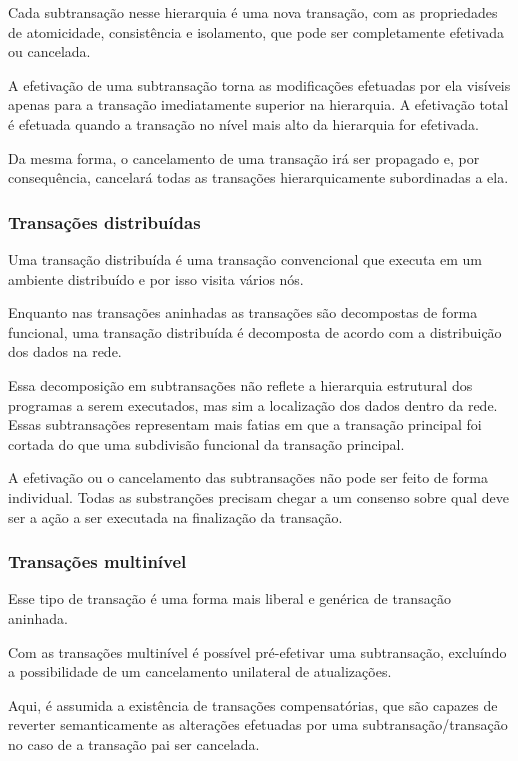 \documentclass[11pt,twoside,a4paper]{book}
\begin{document}
Cada subtransação nesse hierarquia é uma nova transação, com as propriedades de atomicidade, consistência e isolamento, que pode ser completamente efetivada ou cancelada. 

A efetivação de uma subtransação torna as modificações efetuadas por ela visíveis apenas para a transação imediatamente superior na hierarquia. A efetivação total é efetuada quando a transação no nível mais alto da hierarquia for efetivada.

Da mesma forma, o cancelamento de uma transação irá ser propagado e, por consequência, cancelará todas as transações hierarquicamente subordinadas a ela.

\subsubsection*{Transações distribuídas}
Uma transação distribuída é uma transação convencional que executa em um ambiente distribuído e por isso visita vários nós.

Enquanto nas transações aninhadas as transações são decompostas de forma funcional, uma transação distribuída é decomposta de acordo com a distribuição dos dados na rede.

Essa decomposição em subtransações não reflete a hierarquia estrutural dos programas a serem executados, mas sim a localização dos dados dentro da rede. Essas subtransações representam mais fatias em que a transação principal foi cortada do que uma subdivisão funcional da transação principal.

A efetivação ou o cancelamento das subtransações não pode ser feito de forma individual. Todas as substranções precisam chegar a um consenso sobre qual deve ser a ação a ser executada na finalização da transação.

\subsubsection*{Transações multinível}
Esse tipo de transação é uma forma mais liberal e genérica de transação aninhada.

Com as transações multinível é possível pré-efetivar uma subtransação, excluíndo a possibilidade de um cancelamento unilateral de atualizações.

Aqui, é assumida a existência de transações compensatórias, que são capazes de reverter semanticamente as alterações efetuadas por uma subtransação/transação no caso de a transação pai ser cancelada. 
\end{document}
